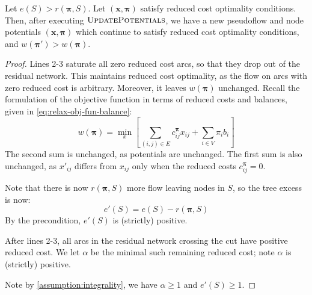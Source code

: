 \begin{lemma} \label{lemma:relax-correctness-updatepotentials}
Let $e(S) > r(\boldsymbol{\pi},S)$. Let $\left(\mathbf{x},\boldsymbol{\pi}\right)$ satisfy reduced cost optimality conditions. Then, after executing $\textproc{UpdatePotentials}$, we have a new pseudoflow and node potentials $\left(\mathbf{x},\boldsymbol{\pi}\right)$ which continue to satisfy reduced cost optimality conditions, and $w(\boldsymbol{\pi}') > w(\boldsymbol{\pi})$.
\end{lemma}
\begin{proof}
Lines 2-3 saturate all zero reduced cost arcs, so that they drop out of the residual network. This maintains reduced cost optimality, as the flow on arcs with zero reduced cost is arbitrary. Moreover, it leaves $w(\boldsymbol{\pi})$ unchanged. Recall the formulation of the objective function in terms of reduced costs and balances, given in \cref{eq:relax-obj-fun-balance}:
\[w(\boldsymbol{\pi})=\min_{x}\left[\sum_{\left(i,j\right)\in E}c_{ij}^{\boldsymbol{\pi}}x_{ij}+\sum_{i\in V}\pi_{i}b_{i}\right]\]
The second sum is unchanged, as potentials are unchanged. The first sum is also unchanged, as $x'_{ij}$ differs from $x_{ij}$ only when the reduced costs $c_{ij}^{\boldsymbol{\pi}}=0$.

Note that there is now $r(\boldsymbol{\pi},S)$ more flow leaving nodes in $S$, so the tree excess is now:
\[e'(S) = e(S) - r(\boldsymbol{\pi},S)\]
By the precondition, $e'(S)$ is (strictly) positive.

After lines 2-3, all arcs in the residual network crossing the cut have positive reduced cost\footnotemark. We let $\alpha$ be the minimal such remaining reduced cost; note $\alpha$ is (strictly) positive.

Note by \cref{assumption:integrality}, we have $\alpha \geq 1 $ and $e'(S) \geq 1$.


\end{proof}
